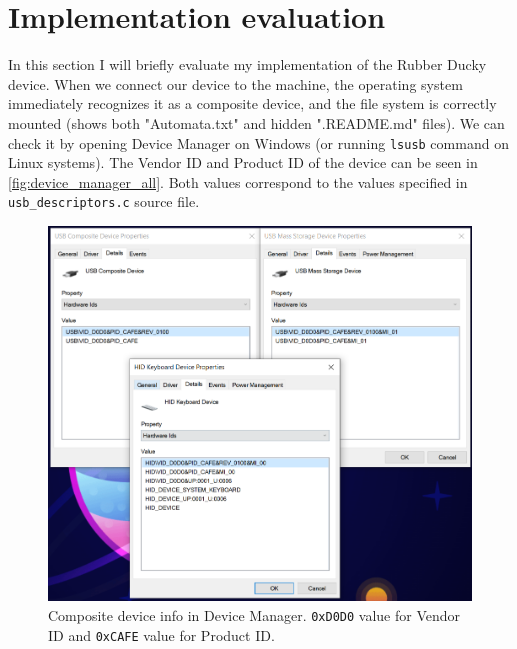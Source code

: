 \chapter{Implementation evaluation}
\label{ch:evaluation}
In this section I will briefly evaluate my implementation of the Rubber Ducky device. When we connect our device to the machine, the operating system immediately recognizes it as a composite device, and the file system is correctly mounted (shows both "Automata.txt" and hidden ".README.md" files). We can check it by opening Device Manager on Windows (or running \verb|lsusb| command on Linux systems). The Vendor ID and Product ID of the device can be seen in \autoref{fig:device_manager_all}. Both values correspond to the values specified in \verb|usb_descriptors.c| source file.
\begin{figure}[ht]
    \centering
    \includegraphics[width=0.75\linewidth]{./obrazky-figures/device_manager_all.png}
    \caption{Composite device info in Device Manager. \texttt{0xD0D0} value for Vendor ID and \texttt{0xCAFE} value for Product ID.}
    \label{fig:device_manager_all}
\end{figure}

